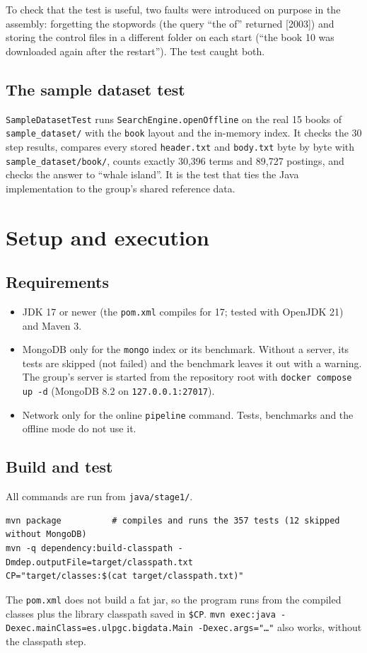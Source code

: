 \documentclass[11pt,a4paper]{article}
\newcommand{\code}[1]{\texttt{#1}}
\begin{document}
To check that the test is useful, two faults were introduced on purpose in the assembly:
forgetting the stopwords (the query ``the of'' returned [2003]) and storing the control files in a
different folder on each start (``the book 10 was downloaded again after the restart''). The test
caught both.

\subsection{The sample dataset test}
\code{SampleDatasetTest} runs \code{SearchEngine.openOffline} on the real 15 books of
\code{sample\_dataset/} with the \code{book} layout and the in-memory index. It checks the 30 step
results, compares every stored \code{header.txt} and \code{body.txt} byte by byte with
\code{sample\_dataset/book/}, counts exactly 30,396 terms and 89,727 postings, and checks the answer
to ``whale island''. It is the test that ties the Java implementation to the group's shared
reference data.

\section{Setup and execution}

\subsection{Requirements}
\begin{itemize}
  \item JDK 17 or newer (the \code{pom.xml} compiles for 17; tested with OpenJDK 21) and Maven 3.
  \item MongoDB only for the \code{mongo} index or its benchmark. Without a server, its tests are
        skipped (not failed) and the benchmark leaves it out with a warning. The group's server is
        started from the repository root with \code{docker compose up -d} (MongoDB 8.2 on
        \code{127.0.0.1:27017}).
  \item Network only for the online \code{pipeline} command. Tests, benchmarks and the offline mode
        do not use it.
\end{itemize}

\subsection{Build and test}
All commands are run from \code{java/stage1/}.
\begin{lstlisting}[style=shell]
mvn package          # compiles and runs the 357 tests (12 skipped without MongoDB)
mvn -q dependency:build-classpath -Dmdep.outputFile=target/classpath.txt
CP="target/classes:$(cat target/classpath.txt)"
\end{lstlisting}
The \code{pom.xml} does not build a fat jar, so the program runs from the compiled classes plus the
library classpath saved in \code{\$CP}. \code{mvn exec:java -Dexec.mainClass=es.ulpgc.bigdata.Main
-Dexec.args="\ldots"} also works, without the classpath step.
\end{document}
